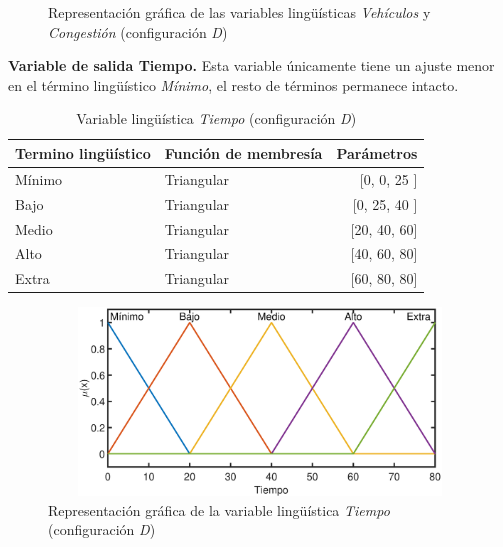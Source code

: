 \begin{figure}[H]
	\centering
	\caption{Representación gráfica de las variables lingüísticas \textit{Vehículos} y \textit{Congestión} (configuración \textit{D})}
\end{figure}
\newpage
\textbf{Variable de salida Tiempo.} Esta variable únicamente tiene un ajuste menor en el término lingüístico \textit{Mínimo}, el resto de términos permanece intacto.\\

\begin{table}[!h]
	\centering
	\begin{tabular}{llr} \toprule
		Termino lingüístico & Función de membresía & Parámetros \\ \midrule
		Mínimo & Triangular & [0, 0, 25 ] \\
		Bajo & Triangular & [0, 25, 40 ] \\
		Medio & Triangular & [20, 40, 60] \\
		Alto & Triangular & [40, 60, 80] \\
		Extra & Triangular & [60, 80, 80] \\ \bottomrule
	\end{tabular}
	\caption{Variable lingüística \textit{Tiempo} (configuración \textit{D})}
\end{table}

\begin{figure}[H]
	\centering
	\includegraphics[height=5cm, width=12cm]{Variables/ConfigD_output1.eps}
	\caption{Representación gráfica de la variable lingüística \textit{Tiempo} (configuración \textit{D})}
\end{figure}

